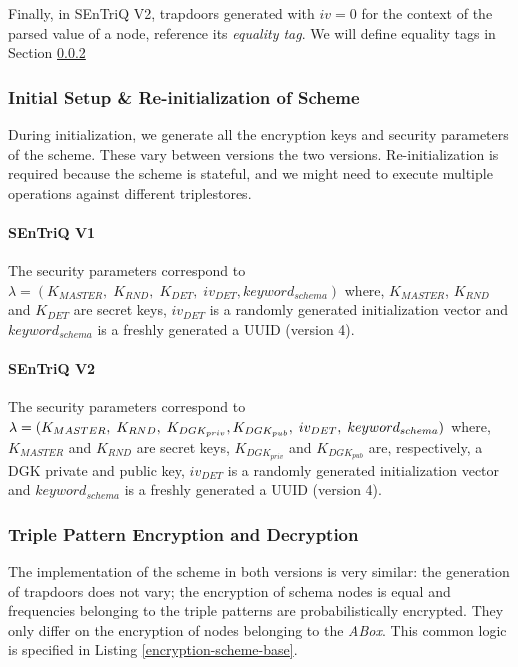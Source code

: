 Finally, in \gls{SEnTriQ} V2, trapdoors generated with $iv = 0$ for the context of the parsed value of a node, reference its \emph{equality tag}. We will define equality tags in Section \ref{ch3:encryption-definition}

\subsubsection{Initial Setup \& Re-initialization of Scheme} 

During initialization, we generate all the encryption keys and security parameters of the scheme. These vary between versions the two versions. Re-initialization is required because the scheme is stateful, and we might need to execute multiple operations against different triplestores.

\paragraph{SEnTriQ V1} The security parameters correspond to $\lambda = (K_{MASTER}, \; K_{RND}, \; K_{DET}, \; iv_{DET}, \allowbreak keyword_{schema})$ where, $K_{MASTER}$, $K_{RND}$ and $K_{DET}$ are secret keys, $iv_{DET}$ is a randomly generated initialization vector and $keyword_{schema}$ is a freshly generated a \gls{UUID} (version 4).

\paragraph{SEnTriQ V2} The security parameters correspond to $\lambda = (K_{MASTER}, \; K_{RND}, \; K_{DGK_{priv}}, \linebreak K_{DGK_{pub}}, \; iv_{DET}, \; keyword_{schema})$ where, $K_{MASTER}$ and $K_{RND}$ are secret keys, $K_{DGK_{priv}}$ and $K_{DGK_{pub}}$ are, respectively, a \gls{DGK} private and public key, $iv_{DET}$ is a randomly generated initialization vector and $keyword_{schema}$ is a freshly generated a \gls{UUID} (version 4).

\subsubsection{Triple Pattern Encryption and Decryption} \label{ch3:encryption-definition} 

The implementation of the scheme in both versions is very similar: the generation of trapdoors does not vary; the encryption of schema nodes is equal and frequencies belonging to the triple patterns are probabilistically encrypted. They only differ on the encryption of nodes belonging to the \emph{ABox}. This common logic is specified in Listing \ref{encryption-scheme-base}.

